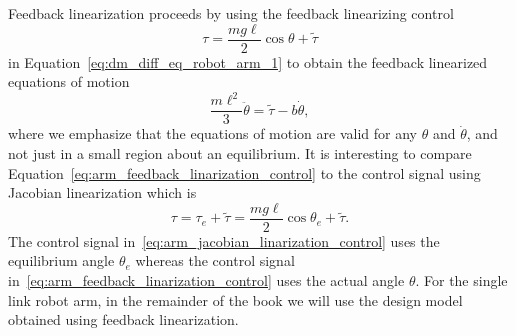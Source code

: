 Feedback linearization proceeds by using the feedback linearizing control
\begin{equation}\label{eq:arm_feedback_linarization_control}
\tau = \frac{mg\ell}{2}\cos\theta + \tilde{\tau}
\end{equation}
in Equation~\eqref{eq:dm_diff_eq_robot_arm_1} to obtain the feedback linearized equations of motion
\begin{equation}\label{eq:arm_linearized_eom_feedback_linarization}
\frac{m\ell^2}{3}\ddot{\theta} = \tilde{\tau} - b\dot{\theta},
\end{equation}
where we emphasize that the equations of motion are valid for any $\theta$ and $\dot{\theta}$, and not just in a small region about an equilibrium.  It is interesting to compare Equation~\eqref{eq:arm_feedback_linarization_control} to the control signal using Jacobian linearization which is
\begin{equation}\label{eq:arm_jacobian_linarization_control}
\tau = \tau_e+\tilde{\tau} = \frac{mg\ell}{2}\cos\theta_e + \tilde{\tau}.
\end{equation}
The control signal in~\eqref{eq:arm_jacobian_linarization_control} uses the equilibrium angle $\theta_e$ whereas the control signal in~\eqref{eq:arm_feedback_linarization_control} uses the actual angle $\theta$.  For the single link robot arm, in the remainder of the book we will use the design model obtained using feedback linearization.

